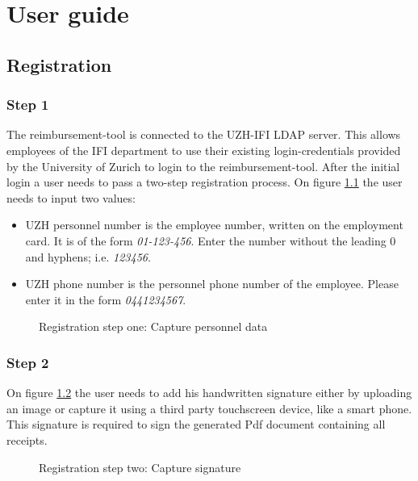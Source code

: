     \chapter{User guide}

\section{Registration}
\label{sec:registration}

\subsection{Step 1}
The reimbursement-tool is connected to the UZH-IFI LDAP server. This allows employees of the IFI department to use their existing login-credentials provided by the University of Zurich to login to the reimbursement-tool.\newline
After the initial login a user needs to pass a two-step registration process. On figure \ref{fig:registration-step01} the user needs to input two values:
\begin{itemize}
    \item UZH personnel number is the employee number, written on the employment card. It is of the form \textit{01-123-456}. Enter the number without the leading 0 and hyphens; i.e. \textit{123456}.
    \item UZH phone number is the personnel phone number of the employee. Please enter it in the form \textit{0441234567}.
\end{itemize}\newpage


\begin{figure}[H]
    \centering
    \caption{Registration step one: Capture personnel data}
    \label{fig:registration-step01}
\end{figure}

\subsection{Step 2}
On figure \ref{fig:registration-step02} the user needs to add his handwritten signature either by uploading an image or capture it using a third party touchscreen device, like a smart phone. This signature is required to sign the generated Pdf document containing all receipts.

\begin{figure}[H]
    \centering
    \caption{Registration step two: Capture signature}
    \label{fig:registration-step02}
\end{figure}

